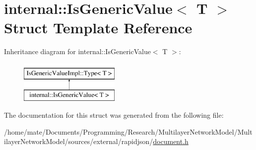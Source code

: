 \hypertarget{structinternal_1_1IsGenericValue}{}\section{internal\+:\+:Is\+Generic\+Value$<$ T $>$ Struct Template Reference}
\label{structinternal_1_1IsGenericValue}
Inheritance diagram for internal\+:\+:Is\+Generic\+Value$<$ T $>$\+:\begin{figure}[H]
\begin{center}
\leavevmode
\includegraphics[height=2.000000cm]{structinternal_1_1IsGenericValue}
\end{center}
\end{figure}


The documentation for this struct was generated from the following file\+:\begin{DoxyCompactItemize}
\item 
/home/mate/\+Documents/\+Programming/\+Research/\+Multilayer\+Network\+Model/\+Multilayer\+Network\+Model/sources/external/rapidjson/\hyperlink{document_8h}{document.\+h}\end{DoxyCompactItemize}
